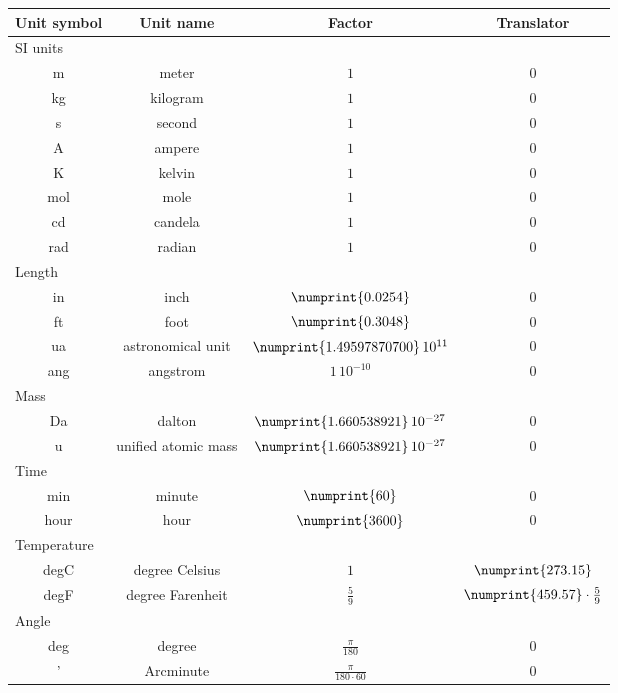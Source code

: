 \begin{longtable}{cccc}\toprule
Unit symbol & Unit name & Factor & Translator \\\midrule
\endhead
\multicolumn{4}{l}{\textsf{SI units}} \\\cmidrule(rl){1-2}
m   & meter    & $1$ & $0$ \\
kg  & kilogram & $1$ & $0$ \\
s   & second   & $1$ & $0$ \\
A   & ampere   & $1$ & $0$ \\
K   & kelvin   & $1$ & $0$ \\
mol & mole     & $1$ & $0$ \\
cd  & candela  & $1$ & $0$ \\
rad & radian   & $1$ & $0$ \\[5pt]
\multicolumn{4}{l}{\textsf{Length}} \\\cmidrule(rl){1-2}
in  &  inch              & $\numprint{0.0254}$                 & $0$ \\
ft  &  foot              & $\numprint{0.3048}$                 & $0$ \\
ua  &  astronomical unit & $\numprint{1.49597870700}\,10^{11}$ & $0$ \\
ang &  angstrom          & $1\,10^{-10}$                       & $0$ \\[5pt]
\multicolumn{4}{l}{\textsf{Mass}} \\\cmidrule(rl){1-2}
Da  &  dalton               & $\numprint{1.660538921}\,10^{-27}$ & $0$ \\
u   &  unified atomic mass  & $\numprint{1.660538921}\,10^{-27}$ & $0$ \\[5pt]
\multicolumn{4}{l}{\textsf{Time}} \\\cmidrule(rl){1-2}
min   &  minute & $\numprint{60}$   & $0$ \\
hour  &  hour   & $\numprint{3600}$ & $0$ \\[5pt]
\multicolumn{4}{l}{\textsf{Temperature}} \\\cmidrule(rl){1-2}
degC  &  degree Celsius   & $1$           & $\numprint{273.15}$ \\
degF  &  degree Farenheit & $\frac{5}{9}$ & $\numprint{459.57}\cdot\frac{5}{9}$ \\[5pt]
\multicolumn{4}{l}{\textsf{Angle}} \\\cmidrule(rl){1-2}
deg & degree    &  $\frac{\pi}{180}$                   & $0$ \\
'   & Arcminute &  $\frac{\pi}{180 \cdot 60}$          & $0$ \\

\end{longtable}
